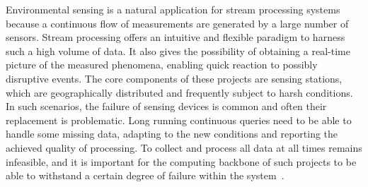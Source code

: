 \vspace{-5pt}
Environmental sensing is a natural application for stream processing systems because a continuous flow of
measurements are generated by a large number of sensors. Stream processing offers an intuitive and
flexible paradigm to harness such a high volume of data. It also gives the possibility of obtaining a
real-time picture of the measured phenomena, enabling quick reaction to possibly disruptive events. The
core components of these projects are sensing stations, which are geographically distributed and
frequently subject to harsh conditions. In such scenarios, the failure of sensing devices is common and
often their replacement is problematic. Long running continuous queries need to be able to handle some missing
data, adapting to the new conditions and reporting the achieved quality of processing. To collect and
process all data at all times remains infeasible, and it is important for the computing backbone of such
projects to be able to withstand a certain degree of failure within the system~\cite{dependable-is-sensing}.
% 
